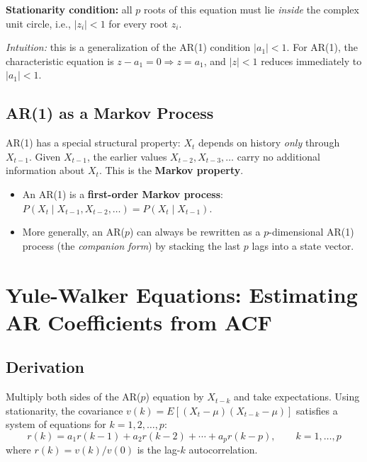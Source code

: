 \documentclass[11pt]{article}
\begin{document}
\textbf{Stationarity condition:} all $p$ roots of this equation must lie
\emph{inside} the complex unit circle, i.e., $|z_i| < 1$ for every root $z_i$.

\textit{Intuition:} this is a generalization of the AR(1) condition $|a_1| < 1$.
For AR(1), the characteristic equation is $z - a_1 = 0 \Rightarrow z = a_1$,
and $|z| < 1$ reduces immediately to $|a_1| < 1$.

\subsection{AR(1) as a Markov Process}
AR(1) has a special structural property: $X_t$ depends on history \emph{only}
through $X_{t-1}$. Given $X_{t-1}$, the earlier values $X_{t-2}, X_{t-3}, \ldots$
carry no additional information about $X_t$. This is the \textbf{Markov property}.

\begin{itemize}
    \item An AR(1) is a \textbf{first-order Markov process}: $P(X_t \mid X_{t-1},
      X_{t-2}, \ldots) = P(X_t \mid X_{t-1})$.
    \item More generally, an AR($p$) can always be rewritten as a $p$-dimensional
      AR(1) process (the \textit{companion form}) by stacking the last $p$ lags
      into a state vector.
\end{itemize}


\section{Yule-Walker Equations: Estimating AR Coefficients from ACF}

\subsection{Derivation}
Multiply both sides of the AR($p$) equation by $X_{t-k}$ and take expectations.
Using stationarity, the covariance $v(k) = E[(X_t - \mu)(X_{t-k} - \mu)]$ satisfies
a system of equations for $k = 1, 2, \ldots, p$:
\[
r(k) = a_1 r(k-1) + a_2 r(k-2) + \cdots + a_p r(k-p), \qquad k = 1, \ldots, p
\]
where $r(k) = v(k)/v(0)$ is the lag-$k$ autocorrelation.
\end{document}
